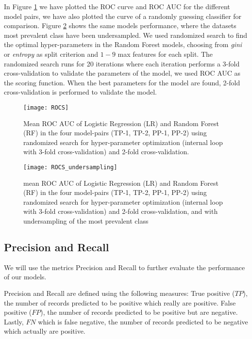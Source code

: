 In Figure \ref{fig:rocs} we have plotted the ROC curve and ROC AUC for the different model pairs, we have also plotted the curve of a randomly guessing classifier for comparison. Figure \ref{fig:rocs_undersampling} shows the same models performance, where the datasets most prevalent class have been undersampled. We used randomized search to find the optimal hyper-parameters in the Random Forest models, choosing from \textit{gini} or \textit{entropy} as split criterion and $1-9$ max features for each split. The randomized search runs for 20 iterations where each iteration performs a 3-fold cross-validation to validate the parameters of the model, we used ROC AUC as the scoring function. When the best parameters for the model are found, 2-fold cross-validation is performed to validate the model.

\begin{figure}[H]
    \hspace*{-1.0cm}
    \centering
    \texttt{[image: ROCS]}
    \caption{Mean ROC AUC of Logistic Regression (LR) and Random Forest (RF) in the four model-pairs (TP-1, TP-2, PP-1, PP-2) using randomized search for hyper-parameter optimization (internal loop with 3-fold cross-validation) and 2-fold cross-validation. }
    \label{fig:rocs}
\end{figure}
\begin{figure}[H]
    \hspace*{-1.0cm}
    \centering
    \texttt{[image: ROCS\_undersampling]}
    \caption{mean ROC AUC of Logistic Regression (LR) and Random Forest (RF) in the four model-pairs (TP-1, TP-2, PP-1, PP-2) using randomized search for hyper-parameter optimization (internal loop with 3-fold cross-validation) and 2-fold cross-validation, and with undersampling of the most prevalent class}
    \label{fig:rocs_undersampling}
\end{figure}

\subsection{Precision and Recall}
We will use the metrics Precision and Recall to further evaluate the performance of our models.

Precision and Recall are defined using the following measures: True positive ($TP$), the number of records predicted to be positive which really are positive. False positive ($FP$), the number of records predicted to be positive but are negative. Lastly, $FN$ which is false negative, the number of records predicted to be negative which actually are positive.

